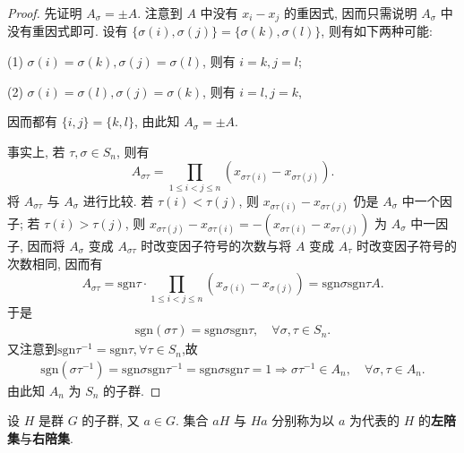 \documentclass[../../main.tex]{subfiles}
\begin{document}
\begin{proof}
先证明 \( A_\sigma = \pm A \). 注意到 \( A \) 中没有 \( x_i - x_j \) 的重因式, 因而只需说明 \( A_\sigma \) 中没有重因式即可. 设有 \( \{\sigma(i), \sigma(j)\} = \{\sigma(k), \sigma(l)\} \), 则有如下两种可能:

(1) \( \sigma(i) = \sigma(k), \sigma(j) = \sigma(l) \), 则有 \( i = k, j = l \);

(2) \( \sigma(i) = \sigma(l), \sigma(j) = \sigma(k) \), 则有 \( i = l, j = k \),

因而都有 \( \{i, j\} = \{k, l\} \), 由此知 \( A_\sigma = \pm A \).

事实上, 若 \( \tau, \sigma \in S_n \), 则有
\[
A_{\sigma\tau} = \prod_{1 \leqslant i < j \leqslant n} (x_{\sigma\tau(i)} - x_{\sigma\tau(j)}).
\]
将 \( A_{\sigma\tau} \) 与 \( A_\sigma \) 进行比较. 若 \( \tau(i) < \tau(j) \), 则 \( x_{\sigma\tau(i)} - x_{\sigma\tau(j)} \) 仍是 \( A_\sigma \) 中一个因子; 若 \( \tau(i) > \tau(j) \), 则 \( x_{\sigma\tau(j)} - x_{\sigma\tau(i)} = -(x_{\sigma\tau(i)} - x_{\sigma\tau(j)}) \) 为 \( A_\sigma \) 中一因子, 因而将 \( A_\sigma \) 变成 \( A_{\sigma\tau} \) 时改变因子符号的次数与将 \( A \) 变成 \( A_\tau \) 时改变因子符号的次数相同, 因而有
\[
A_{\sigma\tau} = \text{sgn}\tau \cdot \prod_{1 \leqslant i < j \leqslant n} (x_{\sigma(i)} - x_{\sigma(j)}) = \text{sgn}\sigma\text{sgn}\tau A.
\]
于是
\begin{align*}
\text{sgn}(\sigma\tau) = \text{sgn}\sigma\text{sgn}\tau, \quad \forall \sigma, \tau \in S_n.
\end{align*}
又注意到$\text{sgn}\tau^{-1}=\text{sgn}\tau,  \forall \tau \in S_n$,故
\begin{align*}
\text{sgn}(\sigma\tau^{-1}) = \text{sgn}\sigma\text{sgn}\tau^{-1}=\text{sgn}\sigma\text{sgn}\tau=1\Longrightarrow \sigma\tau^{-1}\in A_n, \quad \forall \sigma, \tau \in A_n.
\end{align*}
由此知 \( A_n \) 为 \( S_n \) 的子群.
\end{proof}

\begin{definition}
设 \( H \) 是群 \( G \) 的子群, 又 \( a \in G \). 集合 \( aH \) 与 \( Ha \) 分别称为以 \( a \) 为代表的 \( H \) 的\textbf{左陪集}与\textbf{右陪集}.
\end{definition}
\end{document}
